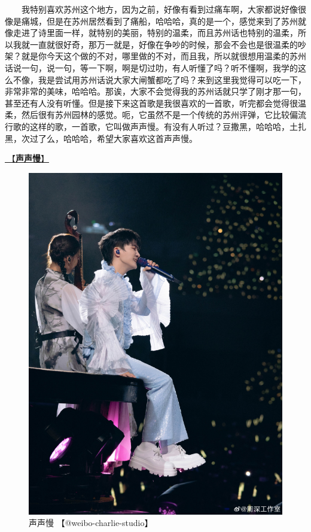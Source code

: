 \documentclass[]{ctexbook}
\begin{document}
  我特别喜欢苏州这个地方，因为之前，好像有看到过痛车啊，大家都说好像很像是痛城，但是在苏州居然看到了痛船，哈哈哈，真的是一个，感觉来到了苏州就像走进了诗里面一样，就特别的美丽，特别的温柔，而且苏州话也特别的温柔，所以我就一直就很好奇，那万一就是，好像在争吵的时候，那会不会也是很温柔的吵架？就是你今天这个做的不对，哪里做的不对，而且我，所以就很想用温柔的苏州话说一句，说一句，等一下啊，啊是切过叻，有人听懂了吗？听不懂啊，我学的这么不像，我是尝试用苏州话说大家大闸蟹都吃了吗？来到这里我觉得可以吃一下，非常非常的美味，哈哈哈。那诶，大家不会觉得我的苏州话就只学了刚才那一句，甚至还有人没有听懂。但是接下来这首歌是我很喜欢的一首歌，听完都会觉得很温柔，然后很有苏州园林的感觉。呃，它虽然不是一个传统的苏州评弹，它比较偏流行歌的这样的歌，一首歌，它叫做声声慢。有没有人听过？豆撒黑，哈哈哈，土扎黑，次过了么，哈哈哈，希望大家喜欢这首声声慢。

\hyperref[say-slowly]{🎵【\textbf{声声慢}】}

\begin{figure}

{\centering \includegraphics[width=400pt]{img/suzhou20241109/004} 

}

\caption{声声慢 【@weibo-charlie-studio】}\label{fig:unnamed-chunk-130}
\end{figure}
\end{document}
